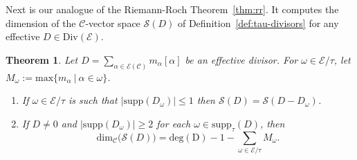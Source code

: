 \documentclass[preprint,12pt]{elsarticle}
\numberwithin{equation}{section} %
\theoremstyle{theorem}
\newtheorem{theorem}{Theorem}[section]
\theoremstyle{definition}
\newcommand{\Ca}{\mathcal{C}} %
\newcommand{\ec}{\mathcal{E}} %
\newcommand{\orbita}{{\ec/\tau}} %
\begin{document}
Next is our analogue of the Riemann-Roch Theorem~\ref{thm:rr}. It computes the dimension of the $\Ca$-vector space $\mathcal{S}(D)$ of Definition~\ref{def:tau-divisors} for any effective $D\in\mathrm{Div}(\ec)$.

\begin{theorem}\label{thm:summable-rr} Let $ D=\sum_{\alpha\in\ec(\Ca)}m_\alpha[\alpha]$ be an effective divisor. For $\omega\in\orbita$, let $M_\omega:=\mathrm{max}\{m_\alpha \ | \ \alpha\in\omega\}$. \begin{enumerate}
\item If $\omega\in\orbita$ is such that $|\mathrm{supp}(D_\omega)|\leq 1$ then $\mathcal{S}(D)=\mathcal{S}(D-D_\omega)$.
    \item If $D\neq 0$ and $|\mathrm{supp}(D_\omega)|\geq 2$ for each $\omega\in\mathrm{supp}_\tau(D)$, then
 \[\mathrm{dim}_\mathcal{C}\bigl(\mathcal{S}(D)\bigr)=\mathrm{deg(D)}-1-\sum_{\omega\in\orbita}M_\omega.\]
\end{enumerate}
\end{theorem}
\end{document}
